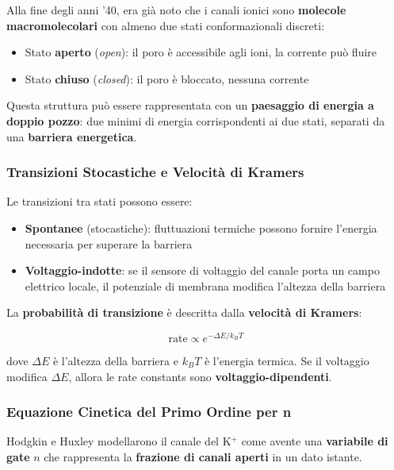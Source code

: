 Alla fine degli anni '40, era già noto che i canali ionici sono \textbf{molecole macromolecolari} con almeno due stati conformazionali discreti:
\begin{itemize}
    \item Stato \textbf{aperto} (\textit{open}): il poro è accessibile agli ioni, la corrente può fluire
    \item Stato \textbf{chiuso} (\textit{closed}): il poro è bloccato, nessuna corrente
\end{itemize}

Questa struttura può essere rappresentata con un \textbf{paesaggio di energia a doppio pozzo}: due minimi di energia corrispondenti ai due stati, separati da una \textbf{barriera energetica}.

\subsubsection{Transizioni Stocastiche e Velocità di Kramers}

Le transizioni tra stati possono essere:
\begin{itemize}
    \item \textbf{Spontanee} (stocastiche): fluttuazioni termiche possono fornire l'energia necessaria per superare la barriera
    \item \textbf{Voltaggio-indotte}: se il sensore di voltaggio del canale porta un campo elettrico locale, il potenziale di membrana modifica l'altezza della barriera
\end{itemize}

La \textbf{probabilità di transizione} è descritta dalla \textbf{velocità di Kramers}:

\begin{equation}
\text{rate} \propto e^{-\Delta E / k_B T}
\end{equation}

dove $\Delta E$ è l'altezza della barriera e $k_B T$ è l'energia termica. Se il voltaggio modifica $\Delta E$, allora le rate constants sono \textbf{voltaggio-dipendenti}.

\subsubsection{Equazione Cinetica del Primo Ordine per n}

Hodgkin e Huxley modellarono il canale del K$^+$ come avente una \textbf{variabile di gate} $n$ che rappresenta la \textbf{frazione di canali aperti} in un dato istante.

